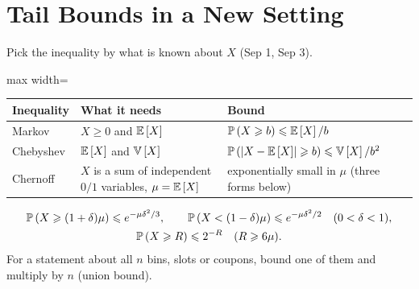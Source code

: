\section{Tail Bounds in a New Setting}\label{sec:tail}

Pick the inequality by what is known about $X$ (Sep 1, Sep 3).
\begin{center}
    \begin{adjustbox}{max width=\textwidth}
    \begin{tabular}{lll}
        \toprule
        Inequality & What it needs                                                      & Bound                                                           \\ \midrule
        Markov     & $X \geq 0$ and $\operatorname{\mathbb{E}}\left[X\right]$                                   & $\operatorname{\mathbb{P}}\left(X \geqslant b\right) \leqslant \operatorname{\mathbb{E}}\left[X\right]/b$               \\
        Chebyshev  & $\operatorname{\mathbb{E}}\left[X\right]$ and $\operatorname{\mathbb{V}}\left[X\right]$                               & $\operatorname{\mathbb{P}}\left(\left\lvert X - \operatorname{\mathbb{E}}\left[X\right]\right\rvert \geqslant b\right) \leqslant \operatorname{\mathbb{V}}\left[X\right]/b^2$ \\
        Chernoff   & $X$ is a sum of independent $0/1$ variables, $\mu = \operatorname{\mathbb{E}}\left[X\right]$ & exponentially small in $\mu$ (three forms below)                \\ \bottomrule
    \end{tabular}
    \end{adjustbox}
\end{center}
\begin{gather*}
    \operatorname{\mathbb{P}}\left(X \geqslant (1+\delta)\mu\right) \leqslant e^{-\mu\delta^2/3},
    \qquad
    \operatorname{\mathbb{P}}\left(X < (1-\delta)\mu\right) \leqslant e^{-\mu\delta^2/2}
    \quad (0 < \delta < 1), \\
    \operatorname{\mathbb{P}}\left(X \geqslant R\right) \leqslant 2^{-R} \quad (R \geqslant 6\mu).
\end{gather*}
For a statement about all $n$ bins, slots or coupons, bound one of them and multiply by $n$ (union
bound).

